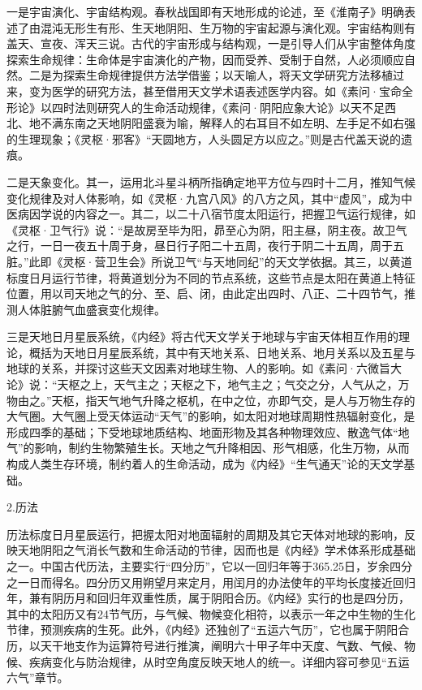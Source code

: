 \documentclass[draft,12pt]{ctexbook}
\begin{document}
一是宇宙演化、宇宙结构观。春秋战国即有天地形成的论述，至《淮南子》明确表述了由混沌无形生有形、生天地阴阳、生万物的宇宙起源与演化观。宇宙结构则有盖天、宣夜、浑天三说。古代的宇宙形成与结构观，一是引导人们从宇宙整体角度探索生命规律：生命体是宇宙演化的产物，因而受养、受制于自然，人必须顺应自然。二是为探索生命规律提供方法学借鉴；以天喻人，将天文学研究方法移植过来，变为医学的研究方法，甚至借用天文学术语表述医学内容。如《素问·宝命全形论》以四时法则研究人的生命活动规律，《素问·阴阳应象大论》以天不足西北、地不满东南之天地阴阳盛衰为喻，解释人的右耳目不如左明、左手足不如右强的生理现象；《灵枢·邪客》“天圆地方，人头圆足方以应之。”则是古代盖天说的遗痕。

二是天象变化。其一，运用北斗星斗柄所指确定地平方位与四时十二月，推知气候变化规律及对人体影响，如《灵枢·九宫八风》的八方之风，其中“虚风”，成为中医病因学说的内容之一。其二，以二十八宿节度太阳运行，把握卫气运行规律，如《灵枢·卫气行》说：“是故房至毕为阳，昴至心为阴，阳主昼，阴主夜。故卫气之行，一日一夜五十周于身，昼日行子阳二十五周，夜行于阴二十五周，周于五脏。”此即《灵枢·营卫生会》所说卫气“与天地同纪”的天文学依据。其三，以黄道标度日月运行节律，将黄道划分为不同的节点系统，这些节点是太阳在黄道上特征位置，用以司天地之气的分、至、启、闭，由此定出四时、八正、二十四节气，推测人体脏腑气血盛衰变化规律。

三是天地日月星辰系统，《内经》将古代天文学关于地球与宇宙天体相互作用的理论，概括为天地日月星辰系统，其中有天地关系、日地关系、地月关系以及五星与地球的关系，并探讨这些天文因素对地球生物、人的影响。如《素问·六微旨大论》说：“天枢之上，天气主之；天枢之下，地气主之；气交之分，人气从之，万物由之。”天枢，指天气地气升降之枢机，在中之位，亦即气交，是人与万物生存的大气圈。大气圈上受天体运动“天气”的影响，如太阳对地球周期性热辐射变化，是形成四季的基础；下受地球地质结构、地面形物及其各种物理效应、散逸气体“地气”的影响，制约生物繁殖生长。天地之气升降相因、形气相感，化生万物，从而构成人类生存环境，制约着人的生命活动，成为《内经》“生气通天”论的天文学基础。

2.历法

历法标度日月星辰运行，把握太阳对地面辐射的周期及其它天体对地球的影响，反映天地阴阳之气消长气数和生命活动的节律，因而也是《内经》学术体系形成基础之一。中国古代历法，主要实行“四分历”，它以一回归年等于365.25日，岁余四分之一日而得名。四分历又用朔望月来定月，用闰月的办法使年的平均长度接近回归年，兼有阴历月和回归年双重性质，属于阴阳合历。《内经》实行的也是四分历，其中的太阳历又有24节气历，与气候、物候变化相符，以表示一年之中生物的生化节律，预测疾病的生死。此外，《内经》还独创了“五运六气历”，它也属于阴阳合历，以天干地支作为运算符号进行推演，阐明六十甲子年中天度、气数、气候、物候、疾病变化与防治规律，从时空角度反映天地人的统一。详细内容可参见“五运六气”章节。
\end{document}
